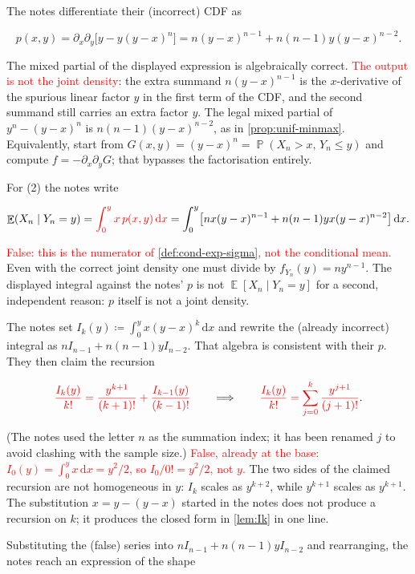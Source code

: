 \documentclass[11pt,a4paper]{article}
\newcommand{\mserr}[1]{\textcolor{red}{#1}}
\DeclareMathOperator{\E}{\mathbb{E}}
\DeclareMathOperator{\Pbb}{\mathbb{P}}
\begin{document}
The notes differentiate their (incorrect) CDF as

\[
p(x,y)
=
\partial_{x}\partial_{y}\bigl[y-y(y-x)^{n}\bigr]
=
n(y-x)^{n-1}+n(n-1)y(y-x)^{n-2}.
\]

The mixed partial of the displayed expression is algebraically correct. \mserr{The output is not the joint density}: the extra summand \( n(y-x)^{n-1} \) is the \( x \)-derivative of the spurious linear factor \( y \) in the first term of the CDF, and the second summand still carries an extra factor \( y \). The legal mixed partial of \( y^{n}-(y-x)^{n} \) is \( n(n-1)(y-x)^{n-2} \), as in \cref{prop:unif-minmax}. Equivalently, start from \( G(x,y)=(y-x)^{n}=\Pbb(X_{n}>x,\,Y_{n}\le y) \) and compute \( f=-\partial_{x}\partial_{y}G \); that bypasses the factorisation entirely.

For (2) the notes write

\[
\E(X_{n}\mid Y_{n}=y)
=
\mserr{\int_{0}^{y} x\,p(x,y)\,\mathrm{d}x}
=
\int_{0}^{y}\bigl[nx(y-x)^{n-1}+n(n-1)yx(y-x)^{n-2}\bigr]\,\mathrm{d}x.
\]

\mserr{False: this is the numerator of \cref{def:cond-exp-sigma}, not the conditional mean.} Even with the correct joint density one must divide by \( f_{Y_{n}}(y)=ny^{n-1} \). The displayed integral against the notes' \( p \) is not \( \E[X_{n}\mid Y_{n}=y] \) for a second, independent reason: \( p \) itself is not a joint density.

The notes set \( I_{k}(y)\coloneqq\int_{0}^{y}x(y-x)^{k}\,\mathrm{d}x \) and rewrite the (already incorrect) integral as \( n I_{n-1}+n(n-1)y I_{n-2} \). That algebra is consistent with their \( p \). They then claim the recursion

\[
\mserr{\frac{I_{k}(y)}{k!}
=
\frac{y^{k+1}}{(k+1)!}+\frac{I_{k-1}(y)}{(k-1)!}}
\qquad\Longrightarrow\qquad
\mserr{\frac{I_{k}(y)}{k!}
=
\sum_{j=0}^{k}\frac{y^{j+1}}{(j+1)!}}.
\]

(The notes used the letter \( n \) as the summation index; it has been renamed \( j \) to avoid clashing with the sample size.) \mserr{False, already at the base: \( I_{0}(y)=\int_{0}^{y}x\,\mathrm{d}x=y^{2}/2 \), so \( I_{0}/0!=y^{2}/2 \), not \( y \).} The two sides of the claimed recursion are not homogeneous in \( y \): \( I_{k} \) scales as \( y^{k+2} \), while \( y^{k+1} \) scales as \( y^{k+1} \). The substitution \( x=y-(y-x) \) started in the notes does not produce a recursion on \( k \); it produces the closed form in \cref{lem:Ik} in one line.

Substituting the (false) series into \( n I_{n-1}+n(n-1)y I_{n-2} \) and rearranging, the notes reach an expression of the shape
\end{document}
